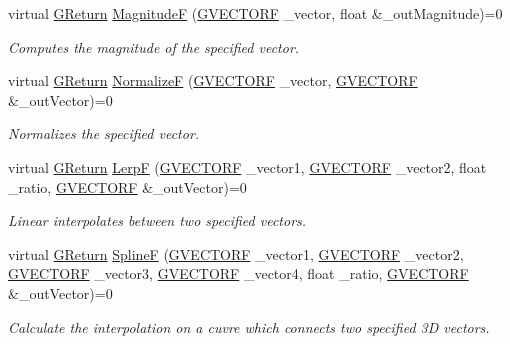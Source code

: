 \begin{DoxyCompactItemize}
virtual \hyperlink{namespaceGW_a67a839e3df7ea8a5c5686613a7a3de21}{G\+Return} \hyperlink{classGW_1_1MATH_1_1GVector_afa368c95bea737f3bd63baf14678d0a9}{MagnitudeF} (\hyperlink{structGW_1_1MATH_1_1GVECTORF}{G\+V\+E\+C\+T\+O\+RF} \+\_\+vector, float \&\+\_\+out\+Magnitude)=0
\begin{DoxyCompactList}\small\item\em Computes the magnitude of the specified vector. \end{DoxyCompactList}\item 
virtual \hyperlink{namespaceGW_a67a839e3df7ea8a5c5686613a7a3de21}{G\+Return} \hyperlink{classGW_1_1MATH_1_1GVector_a736e7cf06c1226df11c092e67f0689ab}{NormalizeF} (\hyperlink{structGW_1_1MATH_1_1GVECTORF}{G\+V\+E\+C\+T\+O\+RF} \+\_\+vector, \hyperlink{structGW_1_1MATH_1_1GVECTORF}{G\+V\+E\+C\+T\+O\+RF} \&\+\_\+out\+Vector)=0
\begin{DoxyCompactList}\small\item\em Normalizes the specified vector. \end{DoxyCompactList}\item 
virtual \hyperlink{namespaceGW_a67a839e3df7ea8a5c5686613a7a3de21}{G\+Return} \hyperlink{classGW_1_1MATH_1_1GVector_aa94d4c2613539433865e684edbaf96b3}{LerpF} (\hyperlink{structGW_1_1MATH_1_1GVECTORF}{G\+V\+E\+C\+T\+O\+RF} \+\_\+vector1, \hyperlink{structGW_1_1MATH_1_1GVECTORF}{G\+V\+E\+C\+T\+O\+RF} \+\_\+vector2, float \+\_\+ratio, \hyperlink{structGW_1_1MATH_1_1GVECTORF}{G\+V\+E\+C\+T\+O\+RF} \&\+\_\+out\+Vector)=0
\begin{DoxyCompactList}\small\item\em Linear interpolates between two specified vectors. \end{DoxyCompactList}\item 
virtual \hyperlink{namespaceGW_a67a839e3df7ea8a5c5686613a7a3de21}{G\+Return} \hyperlink{classGW_1_1MATH_1_1GVector_a8e55aed1762134abcfd485099813ae64}{SplineF} (\hyperlink{structGW_1_1MATH_1_1GVECTORF}{G\+V\+E\+C\+T\+O\+RF} \+\_\+vector1, \hyperlink{structGW_1_1MATH_1_1GVECTORF}{G\+V\+E\+C\+T\+O\+RF} \+\_\+vector2, \hyperlink{structGW_1_1MATH_1_1GVECTORF}{G\+V\+E\+C\+T\+O\+RF} \+\_\+vector3, \hyperlink{structGW_1_1MATH_1_1GVECTORF}{G\+V\+E\+C\+T\+O\+RF} \+\_\+vector4, float \+\_\+ratio, \hyperlink{structGW_1_1MATH_1_1GVECTORF}{G\+V\+E\+C\+T\+O\+RF} \&\+\_\+out\+Vector)=0
\begin{DoxyCompactList}\small\item\em Calculate the interpolation on a cuvre which connects two specified 3D vectors. \end{DoxyCompactList}\item 

\end{DoxyCompactItemize}
